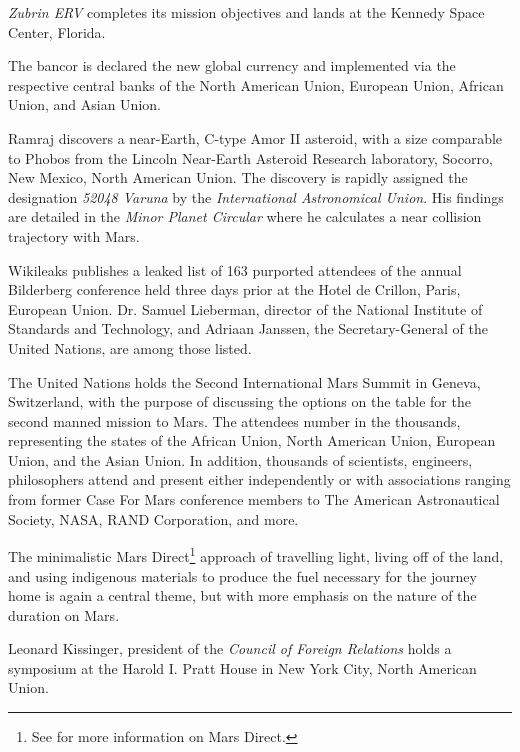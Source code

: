 {\it Zubrin ERV} completes its mission objectives and lands at the Kennedy Space Center, Florida.
\StopTimelineDate

The bancor is declared the new global currency and implemented via the respective central banks of the North American Union, European Union, African Union, and Asian Union.
\StopTimelineDate

Ramraj discovers a near-Earth, C-type Amor II asteroid, with a size comparable to Phobos from the Lincoln Near-Earth Asteroid Research laboratory, Socorro, New Mexico, North American Union. The discovery is rapidly assigned the designation {\it 52048 Varuna} by the {\it International Astronomical Union}. His findings are detailed in the {\it Minor Planet Circular} where he calculates a near collision trajectory with Mars.
\StopTimelineDate

Wikileaks publishes a leaked list of 163 purported attendees of the annual Bilderberg conference held three days prior at the Hotel de Crillon, Paris, European Union. Dr. Samuel Lieberman, director of the National Institute of Standards and Technology, and Adriaan Janssen, the Secretary-General of the United Nations, are among those listed.
\StopTimelineDate

The United Nations holds the Second International Mars Summit in Geneva, Switzerland, with the purpose of discussing the options on the table for the second manned mission to Mars. The attendees number in the thousands, representing the states of the African Union, North American Union, European Union, and the Asian Union. In addition, thousands of scientists, engineers, philosophers attend and present either independently or with associations ranging from former Case For Mars conference members to The American Astronautical Society, NASA, RAND Corporation, and more.

The minimalistic Mars Direct\footnote{See  for more information on Mars Direct.} approach of travelling light, living off of the land, and using indigenous materials to produce the fuel necessary for the journey home is again a central theme, but with more emphasis on the nature of the duration on Mars.
\StopTimelineDate

Leonard Kissinger, president of the {\it Council of Foreign Relations} holds a symposium at the Harold I. Pratt House in New York City, North American Union.
\StopTimelineDate

